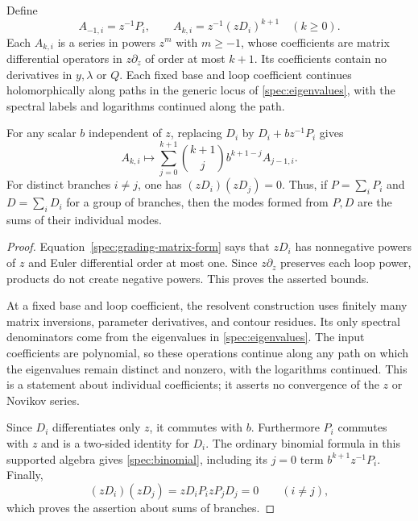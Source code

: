 \begin{proposition}
\label{spec:modes}
Define
\begin{equation}
 A_{-1,i}=z^{-1}P_i,\qquad
 A_{k,i}=z^{-1}(zD_i)^{k+1}\quad(k\geq0).
 \label{spec:mode-definition}
\end{equation}
Each $A_{k,i}$ is a series in powers $z^m$ with $m\geq-1$, whose
coefficients are matrix differential operators in $z\partial_z$
of order at most $k+1$.  Its coefficients contain no derivatives
in $y,\lambda$ or $Q$.  Each fixed base and loop coefficient
continues holomorphically along paths in the generic locus of
\eqref{spec:eigenvalues}, with the spectral labels and logarithms
continued along the path.

For any scalar $b$ independent of $z$, replacing $D_i$ by
$D_i+bz^{-1}P_i$ gives
\begin{equation}
 A_{k,i}\longmapsto
   \sum_{j=0}^{k+1}\binom{k+1}{j}b^{k+1-j}A_{j-1,i}.
 \label{spec:binomial}
\end{equation}
For distinct branches $i\neq j$, one has
$(zD_i)(zD_j)=0$.  Thus, if $P=\sum_iP_i$ and
$D=\sum_iD_i$ for a group of branches, then the modes formed from
$P,D$ are the sums of their individual modes.
\end{proposition}

\begin{proof}
Equation~\eqref{spec:grading-matrix-form} says that $zD_i$ has
nonnegative powers of $z$ and Euler differential order at most
one.  Since $z\partial_z$ preserves each loop power, products do
not create negative powers.  This proves the asserted bounds.

At a fixed base and loop coefficient, the resolvent construction
uses finitely many matrix inversions, parameter derivatives, and
contour residues.  Its only spectral denominators come from the
eigenvalues in \eqref{spec:eigenvalues}.  The input coefficients
are polynomial, so these operations continue along any path on
which the eigenvalues remain distinct and nonzero, with the
logarithms continued.  This is a statement about individual
coefficients; it asserts no convergence of the $z$ or Novikov
series.

Since $D_i$ differentiates only $z$, it commutes with $b$.
Furthermore $P_i$ commutes with $z$ and is a two-sided identity
for $D_i$.  The ordinary binomial formula in this supported
algebra gives \eqref{spec:binomial}, including its $j=0$ term
$b^{k+1}z^{-1}P_i$.  Finally,
\[
 (zD_i)(zD_j)
   =zD_iP_i zP_jD_j=0
 \qquad(i\neq j),
\]
which proves the assertion about sums of branches.
\end{proof}

